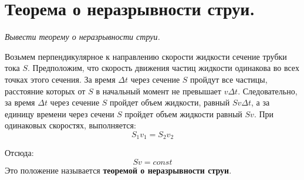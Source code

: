 \documentclass{article}
\begin{document}
    \section{Теорема о неразрывности струи.}
    \par
      \textit{Вывести теорему о неразрывности струи.}\\
    \par       
      Возьмем перпендикулярное к направлению скорости жидкости сечение трубки тока $S$. Предположим, что скорость движения частиц жидкости одинакова во всех точках этого сечения. За время $\Delta t$ через сечение $S$ пройдут все частицы, расстояние которых от $S$ в начальный момент не превышает $v\Delta t$. Следовательно, за время $\Delta t$ через сечение $S$ пройдет объем жидкости, равный $Sv\Delta t$, а за единицу времени через сечени $S$ пройдет объем жидкости равный $Sv$. При одинаковых скоростях, выполняется:
      \begin{equation}
	S_1v_1=S_2v_2
      \end{equation}
    \par
      Отсюда:
      \begin{equation}
	Sv=const
      \end{equation}
      Это положение называется \textbf{теоремой о неразрывности струи}.
  \clearpage
    
\end{document}
